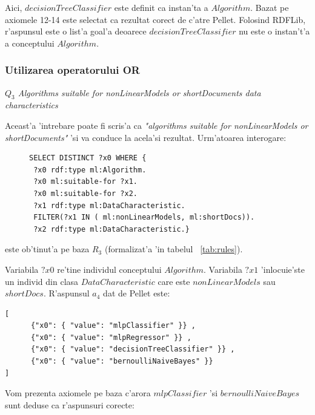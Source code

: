 \documentclass[12pt,a4paper,twoside]{report}
\begin{document}
Aici, $decisionTreeClassifier$ este definit ca instan'ta a $Algorithm$. Bazat pe axiomele 12-14 este selectat ca rezultat corect de c'atre Pellet. Folosind RDFLib, r'aspunsul este o list'a goal'a deoarece  $decisionTreeClassifier$ nu este o instan't'a a conceptului $Algorithm$.

\subsubsection{Utilizarea operatorului OR}
{\it $Q_3$ Algorithms suitable for nonLinearModels or shortDocuments data characteristics}

Aceast'a 'intrebare poate fi scris'a ca {\it"algorithms suitable for nonLinearModels or shortDocuments"} 'si va conduce la acela'si rezultat. Urm'atoarea interogare:

\begin{figure}[h]
\begin{footnotesize}
\begin{lstlisting}[captionpos=b, caption=Q3 SPARQL query, label=lst:sparql,  basicstyle=\ttfamily,frame=single]
SELECT DISTINCT ?x0 WHERE {
 ?x0 rdf:type ml:Algorithm.
 ?x0 ml:suitable-for ?x1.
 ?x0 ml:suitable-for ?x2.
 ?x1 rdf:type ml:DataCharacteristic.
 FILTER(?x1 IN ( ml:nonLinearModels, ml:shortDocs)).
 ?x2 rdf:type ml:DataCharacteristic.}
\end{lstlisting}
\end{footnotesize}
\end{figure}

este ob'tinut'a pe baza $R_3$ (formalizat'a 'in tabelul ~\ref{tab:rules}).

Variabila $?x0$ re'tine individul conceptului $Algorithm$. Variabila $?x1$ 'inlocuie'ste un individ din clasa $DataCharacteristic$ care este $nonLinearModels$ sau $shortDocs$. R'aspunsul $a_4$ dat de Pellet este:
\begin{lstlisting}[basicstyle=\footnotesize]
[
      {"x0": { "value": "mlpClassifier" }} ,
      {"x0": { "value": "mlpRegressor" }} ,
      {"x0": { "value": "decisionTreeClassifier" }} ,
      {"x0": { "value": "bernoulliNaiveBayes" }}
]
\end{lstlisting}

Vom prezenta axiomele pe baza c'arora $mlpClassifier$ 'si $bernoulliNaiveBayes$ sunt deduse ca r'aspunsuri corecte:
\end{document}
